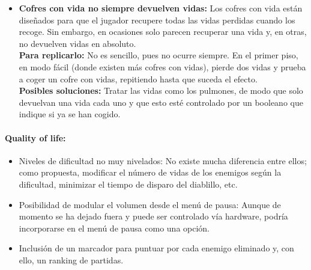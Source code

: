 \documentclass[12pt,a4paper,twoside,spanish]{article}      %
\begin{document}
\begin{itemize}
    \item \textbf{Cofres con vida no siempre devuelven vidas:} Los cofres con vida están diseñados para que el jugador recupere todas las vidas perdidas cuando los recoge. Sin embargo, en ocasiones solo parecen recuperar una vida y, en otras, no devuelven vidas en absoluto.\\[1mm]
    \textbf{Para replicarlo:} No es sencillo, pues no ocurre siempre. En el primer piso, en modo fácil (donde existen más cofres con vidas), pierde dos vidas y prueba a coger un cofre con vidas, repitiendo hasta que suceda el efecto.\\[1mm]
    \textbf{Posibles soluciones:} Tratar las vidas como los pulmones, de modo que solo devuelvan una vida cada uno y que esto esté controlado por un booleano que indique si ya se han cogido.
\end{itemize}

\bigskip

\paragraph{Quality of life:}

\begin{itemize}
    \item Niveles de dificultad no muy nivelados: No existe mucha diferencia entre ellos; como propuesta, modificar el número de vidas de los enemigos según la dificultad, minimizar el tiempo de disparo del diablillo, etc.
    \item Posibilidad de modular el volumen desde el menú de pausa: Aunque de momento se ha dejado fuera y puede ser controlado vía hardware, podría incorporarse en el menú de pausa como una opción.
    \item Inclusión de un marcador para puntuar por cada enemigo eliminado y, con ello, un ranking de partidas.
\end{itemize}
\end{document}
